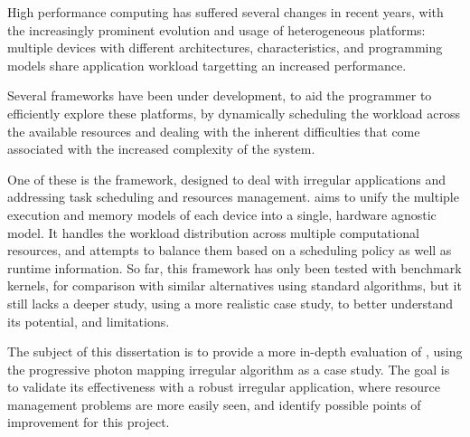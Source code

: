 \documentclass[main.tex]{subfiles}
\begin{document}
High performance computing has suffered several changes in recent years, with the increasingly prominent evolution and usage of heterogeneous platforms: multiple devices with different architectures, characteristics, and programming models share application workload targetting an increased performance.

Several frameworks have been under development, to aid the programmer to efficiently explore these platforms, by dynamically scheduling the workload across the available resources and dealing with the inherent difficulties that come associated with the increased complexity of the system.

One of these is the \gama framework, designed to deal with irregular applications and addressing task scheduling and resources management. \gama aims to unify the multiple execution and memory models of each device into a single, hardware agnostic model. It handles the workload distribution across multiple computational resources, and attempts to balance them based on a scheduling policy as well as runtime information. So far, this framework has only been tested with benchmark kernels, for comparison with similar alternatives using standard algorithms, but it still lacks a deeper study, using a more realistic case study, to better understand its potential, and limitations.

The subject of this dissertation is to provide a more in-depth evaluation of \gama, using the progressive photon mapping irregular algorithm as a case study. The goal is to validate its effectiveness with a robust irregular application, where resource management problems are more easily seen, and identify possible points of improvement for this project.

\newpage
{}
\end{document}
